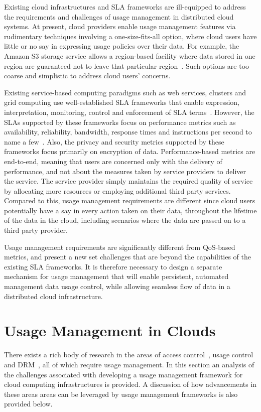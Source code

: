 \documentclass[notitlepage]{book}
\begin{document}
\begin{doublespace}
Existing cloud infrastructures and SLA frameworks are ill-equipped to address the requirements and challenges of usage management in distributed cloud systems. At present, cloud providers enable usage management features via rudimentary techniques involving a  one-size-fits-all option, where cloud users have little or no say in expressing usage policies over their data. For example, the Amazon S3 storage service allows a region-based facility where data stored in one region are guaranteed not to leave that particular region~\cite{AWS}. Such options are too coarse and simplistic to address cloud users' concerns. 

Existing service-based computing paradigms such as web services, clusters and grid computing use well-established SLA frameworks that enable expression, interpretation, monitoring, control and enforcement of SLA terms~\cite{WSLA,WSA,PaRaSh:09,WSP}. However, the SLAs supported by these frameworks focus on performance metrics such as availability, reliability, bandwidth, response times and instructions per second to name a few~\cite{PaSc:06}. Also, the privacy and security metrics supported by these frameworks focus primarily on encryption of data. Performance-based metrics are end-to-end, meaning that users are concerned only with the delivery of performance, and not about the measures taken by service providers to deliver the service. The service provider simply maintains the required quality of service by allocating more resources or employing additional third party services. Compared to this, usage management requirements are different since cloud users potentially have a say in every action taken on their data, throughout the lifetime of the data in the cloud, including scenarios where the data are passed on to a third party provider. 

Usage management requirements are significantly different from QoS-based metrics, and present a new set challenges that are beyond the capabilities of the existing SLA frameworks. It is therefore necessary to design a separate mechanism for usage management that will enable persistent, automated management data usage control, while allowing seamless flow of data in a distributed cloud infrastructure. 

\section{Usage Management in Clouds}\label{sec:clouds-usage}
There exists a rich body of research in the areas of access control~\cite{BlPa:73,BlPa:76}, usage control~\cite{JaHeLa:10,PaSa:04} and DRM~\cite{ ODRL-req,ArHu:07,HaWe:08,JaHe:08,XrML-spec}, all of which require usage management.  In this section an analysis of the challenges associated with developing a usage management framework for cloud computing infrastructures is provided. A discussion of how advancements in these areas areas can be leveraged by usage management frameworks is also provided below.


\end{doublespace}
\end{document}
